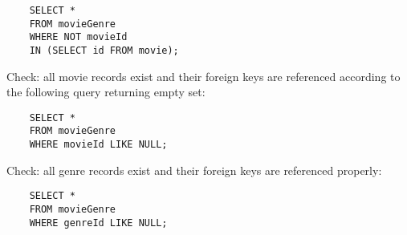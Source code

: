 \begin{verbatim}
	SELECT * 
	FROM movieGenre 
	WHERE NOT movieId
	IN (SELECT id FROM movie); 
\end{verbatim}

\noindent Check: all movie records exist and their foreign keys are referenced according to the following query returning empty set: 

\begin{verbatim}
	SELECT * 
	FROM movieGenre
	WHERE movieId LIKE NULL; 
\end{verbatim}

\noindent Check: all genre records exist and their foreign keys are referenced properly: 

\begin{verbatim}
	SELECT * 
	FROM movieGenre
	WHERE genreId LIKE NULL; 
\end{verbatim}


\begin{comment}
Put onenote stuff here 
\end{comment}
